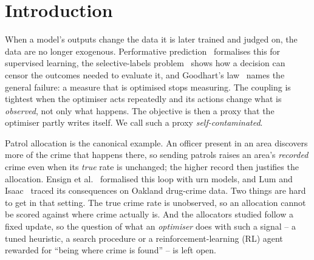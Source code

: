 %

\section{Introduction}

When a model's outputs change the data it is later trained and judged on, the
data are no longer exogenous. Performative prediction~\cite{perdomo2020}
formalises this for supervised learning, the selective-labels
problem~\cite{lakkaraju2017} shows how a decision can censor the outcomes needed
to evaluate it, and Goodhart's law~\cite{manheim2018} names the general failure:
a measure that is optimised stops measuring. The coupling is tightest when the
optimiser acts repeatedly and its actions change what is \emph{observed}, not
only what happens. The objective is then a proxy that the optimiser partly
writes itself. We call such a proxy \emph{self-contaminated}.

Patrol allocation is the canonical example. An officer present in an area
discovers more of the crime that happens there, so sending patrols raises an
area's \emph{recorded} crime even when its \emph{true} rate is unchanged; the
higher record then justifies the allocation. Ensign et al.~\cite{ensign2018}
formalised this loop with urn models, and Lum and Isaac~\cite{lum2016} traced
its consequences on Oakland drug-crime data. Two things are hard to get in that
setting. The true crime rate is unobserved, so an allocation cannot be scored
against where crime actually is. And the allocators studied follow a fixed
update, so the question of what an \emph{optimiser} does with such a signal --
a tuned heuristic, a search procedure or a reinforcement-learning (RL) agent
rewarded for ``being where crime is found'' -- is left open.

